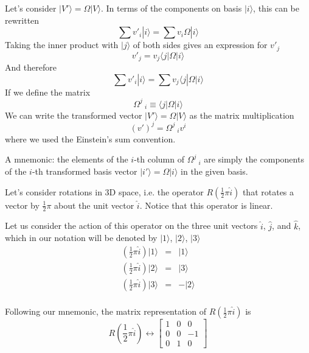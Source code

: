 \documentclass[11pt,fleqn]{book} %
\newcommand{\bra}[1]{\langle #1|}
\newcommand{\ket}[1]{| #1\rangle}
\begin{document}
Let's consider $\ket{V'}=\Omega\ket{V}$. In terms of the components on basis $\ket{i}$, this can be rewritten
\begin{equation*}
    \sum v'_i\ket{i} = \sum v_i\Omega\ket{i}
\end{equation*}
Taking the inner product with $\ket{j}$ of both sides gives an expression for $v'_j$
\begin{equation*}
    v'_j = v_j\bra{j}\Omega\ket{i}
\end{equation*}
And therefore
\begin{equation*}
    \sum v'_i\ket{i} = \sum v_j\bra{j}\Omega\ket{i}
\end{equation*}
If we define the matrix
\begin{equation}
    \label{eq:matrix_operator}
    \Omega^j\:_i\equiv \bra{j}\Omega\ket{i}
\end{equation}
We can write the transformed vector $\ket{V'}=\Omega\ket{V}$ as the matrix multiplication
\begin{equation}
    (v')^j=\Omega^j\:_iv^i    
\end{equation}
where we used the Einstein's sum convention.

\begin{remark}
    A mnemonic: the elements of the $i$-th column of $\Omega^j\:_i$ are simply the components of the $i$-th
transformed basis vector $\ket{i'}=\Omega\ket{i}$ in the given basis.
\end{remark}

\begin{example}
    \label{example:rotation_matrix}
    Let's consider rotations in 3D space, i.e. the operator $R\left(\frac{1}{2}\pi \hat i\right)$ that rotates
    a vector by $\frac{1}{2}\pi$ about the unit vector $\hat i$. Notice that this operator is linear.
    
    Let us consider the action of this operator on the three unit vectors $\hat i$, $\hat j$, and $\hat k$, which
    in our notation will be denoted by $\ket{1}$, $\ket{2}$, $\ket{3}$
    \begin{eqnarray*}
        \left(\frac{1}{2}\pi \hat i\right)\ket{1} &=& \ket{1} \\
        \left(\frac{1}{2}\pi \hat i\right)\ket{2} &=& \ket{3} \\
        \left(\frac{1}{2}\pi \hat i\right)\ket{3} &=& -\ket{2} \\
    \end{eqnarray*}

    Following our mnemonic, the matrix representation of $R\left(\frac{1}{2}\pi \hat i\right)$ is
    \begin{equation*}
        R\left(\frac{1}{2}\pi \hat i\right) \leftrightarrow \left[\begin{array}{ccc}
            1&0&0\\
            0&0&-1\\
            0&1&0
        \end{array}\right]
    \end{equation*}
\end{example}
\end{document}
